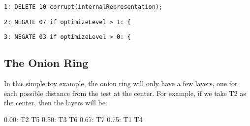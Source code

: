 {\scriptsize {\tt 1: DELETE  10                corrupt(internalRepresentation);}}

{\scriptsize {\tt 2: NEGATE  07       if optimizeLevel > 1: \{}}

{\scriptsize {\tt 3: NEGATE  03    if optimizeLevel > 0: \{}}

\subsection{The Onion Ring}

In this simple toy example, the onion ring will only have a few
layers, one for each possible distance from the test at the center.
For example, if we take T2 as the center, then the layers will be:

\begin{code}
 0.00:  T2 T5
 0.50:  T3 T6
 0.67:  T7
 0.75:  T1 T4
\end{code}